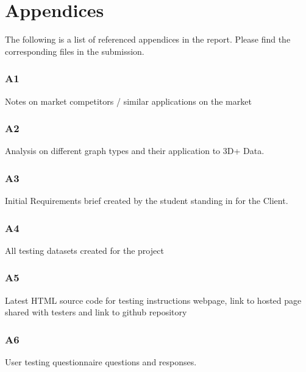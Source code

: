 \section{Appendices}
The following is a list of referenced appendices in the report. Please find the corresponding files in the submission.

\subsubsection{A1} \label{A1}
Notes on market competitors / similar applications on the market

\subsubsection{A2} \label{A2}
Analysis on different graph types and their application to 3D+ Data.

\subsubsection{A3} \label{A3}
Initial Requirements brief created by the student standing in for the Client.

\subsubsection{A4} \label{A4}
All testing datasets created for the project

\subsubsection{A5} \label{A5}
Latest HTML source code for testing instructions webpage, link to hosted page shared with testers and link to github repository

\subsubsection{A6} \label{A6}
User testing questionnaire questions and responses.